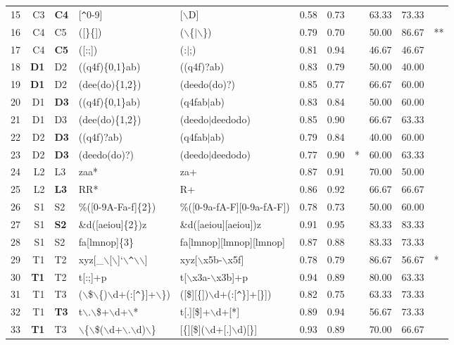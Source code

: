 \begin{table*}[ht]
\begin{tabular}{rr@{ -- }lllrrlrrl}
  15 & C3 & {\bf C4} & [\verb|^|0-9] & [$\backslash$D] & 0.58 & 0.73 &   & 63.33 & 73.33 &   \\ 
  16 & C4 & C5 & ([\}\{]) & ($\backslash$\{$|$$\backslash$\}) & 0.79 & 0.70 &   & 50.00 & 86.67 & ** \\ 
  17 & C4 & {\bf C5} & ([:;]) & (:$|$;) & 0.81 & 0.94 &   & 46.67 & 46.67 &   \\ 
  \hline
  18 & {\bf D1} & D2 & ((q4f)\{0,1\}ab) & ((q4f)?ab) & 0.83 & 0.79 &   & 50.00 & 40.00 &   \\ 
  19 & {\bf D1} & D2 & (dee(do)\{1,2\}) & (deedo(do)?) & 0.85 & 0.77 &   & 66.67 & 60.00 &   \\ 
  20 & D1 & {\bf D3} & ((q4f)\{0,1\}ab) & (q4fab$|$ab) & 0.83 & 0.84 &   & 50.00 & 60.00 &   \\ 
  21 & D1 & D3 & (dee(do)\{1,2\}) & (deedo$|$deedodo) & 0.85 & 0.90 &   & 66.67 & 63.33 &   \\ 

  22 & D2 & {\bf D3} & ((q4f)?ab) & (q4fab$|$ab) & 0.79 & 0.84 &   & 40.00 & 60.00 &   \\ 
  23 & D2 & {\bf D3} & (deedo(do)?) & (deedo$|$deedodo) & 0.77 & 0.90 & * & 60.00 & 63.33 &   \\ 
  \hline
  24 & L2 & L3 & zaa* & za+ & 0.87 & 0.91 &   & 70.00 & 50.00 &   \\ 
  25 & L2 & {\bf L3} & RR* & R+ & 0.86 & 0.92 &   & 66.67 & 66.67 &   \\ 
  \hline
  26 & S1 & S2 & \%([0-9A-Fa-f]\{2\}) & \%([0-9a-fA-F][0-9a-fA-F]) & 0.78 & 0.73 &   & 50.00 & 60.00 &   \\ 
  27 & S1 & {\bf S2} & \&d([aeiou]\{2\})z & \&d([aeiou][aeiou])z & 0.91 & 0.95 &   & 83.33 & 83.33 &   \\ 
  28 & S1 & S2 & fa[lmnop]\{3\} & fa[lmnop][lmnop][lmnop] & 0.87 & 0.88 &   & 83.33 & 73.33 &   \\ 
  \hline
  29 & T1 & T2 & xyz[\_$\backslash$[$\backslash$]`$\backslash$\verb|^|$\backslash$$\backslash$] & xyz[$\backslash$x5b-$\backslash$x5f] & 0.78 & 0.79 &   & 86.67 & 56.67 & * \\ 
  30 & {\bf T1} & T2 & t[:;]+p & t[$\backslash$x3a-$\backslash$x3b]+p & 0.94 & 0.89 &   & 80.00 & 63.33 &   \\ 
  
  31 & T1 & T3 & ($\backslash$\$$\backslash$\{)$\backslash$d+(:[\verb|^|\}]+$\backslash$\}) & ([\$][\{])$\backslash$d+(:[\verb|^|\}]+[\}]) & 0.82 & 0.75 &   & 63.33 & 73.33 &   \\ 
  32 & T1 & {\bf T3} & t$\backslash$.$\backslash$\$+$\backslash$d+$\backslash$* & t[.][\$]+$\backslash$d+[*] & 0.89 & 0.94 &   & 56.67 & 73.33 &   \\ 
  33 & {\bf T1} & T3 & $\backslash$\{$\backslash$\$($\backslash$d+$\backslash$.$\backslash$d)$\backslash$\} & [\{][\$]($\backslash$d+[.]$\backslash$d)[\}] & 0.93 & 0.89 &   & 70.00 & 66.67 &   \\ 
  

\end{tabular}
\end{table*}
